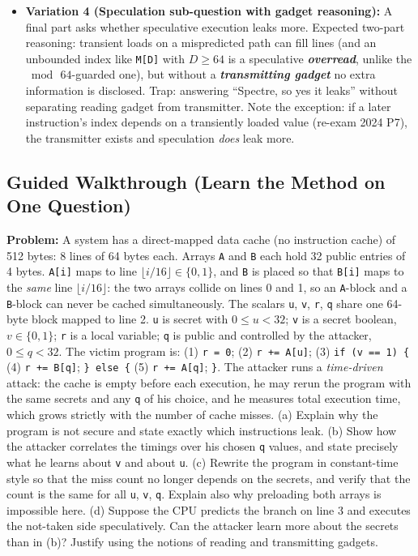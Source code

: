 \documentclass[12pt, a4paper]{article}
\newcommand{\term}[1]{\textbf{\textit{#1}}}        %
\begin{document}
\begin{trapbox}
\begin{itemize}
    \item \textbf{Variation 4 (Speculation sub-question with gadget reasoning):} A final part asks whether speculative execution leaks more. Expected two-part reasoning: transient loads on a mispredicted path can fill lines (and an unbounded index like \texttt{M[D]} with $D \geq 64$ is a speculative \term{overread}, unlike the $\bmod\, 64$-guarded one), but without a \term{transmitting gadget} no extra information is disclosed. Trap: answering ``Spectre, so yes it leaks'' without separating reading gadget from transmitter. Note the exception: if a later instruction's index depends on a transiently loaded value (re-exam 2024 P7), the transmitter exists and speculation \emph{does} leak more.
\end{itemize}
\end{trapbox}

\subsection*{Guided Walkthrough (Learn the Method on One Question)}
\textbf{Problem:} A system has a direct-mapped data cache (no instruction cache) of 512 bytes: 8 lines of 64 bytes each. Arrays \texttt{A} and \texttt{B} each hold 32 public entries of 4 bytes. \texttt{A[i]} maps to line $\lfloor i/16 \rfloor \in \{0,1\}$, and \texttt{B} is placed so that \texttt{B[i]} maps to the \emph{same} line $\lfloor i/16 \rfloor$: the two arrays collide on lines 0 and 1, so an \texttt{A}-block and a \texttt{B}-block can never be cached simultaneously. The scalars \texttt{u}, \texttt{v}, \texttt{r}, \texttt{q} share one 64-byte block mapped to line 2. \texttt{u} is secret with $0 \leq u < 32$; \texttt{v} is a secret boolean, $v \in \{0,1\}$; \texttt{r} is a local variable; \texttt{q} is public and controlled by the attacker, $0 \leq q < 32$. The victim program is: (1) \texttt{r = 0}; (2) \texttt{r += A[u]}; (3) \texttt{if (v == 1) \{} (4) \texttt{r += B[q]}; \texttt{\} else \{} (5) \texttt{r += A[q]}; \texttt{\}}. The attacker runs a \emph{time-driven} attack: the cache is empty before each execution, he may rerun the program with the same secrets and any \texttt{q} of his choice, and he measures total execution time, which grows strictly with the number of cache misses. (a) Explain why the program is not secure and state exactly which instructions leak. (b) Show how the attacker correlates the timings over his chosen \texttt{q} values, and state precisely what he learns about \texttt{v} and about \texttt{u}. (c) Rewrite the program in constant-time style so that the miss count no longer depends on the secrets, and verify that the count is the same for all \texttt{u}, \texttt{v}, \texttt{q}. Explain also why preloading both arrays is impossible here. (d) Suppose the CPU predicts the branch on line 3 and executes the not-taken side speculatively. Can the attacker learn more about the secrets than in (b)? Justify using the notions of reading and transmitting gadgets.
\end{document}
